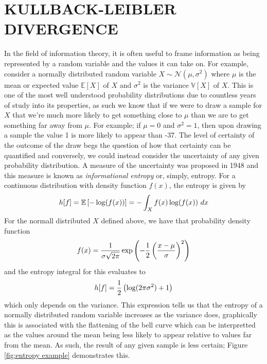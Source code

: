\chapter{KULLBACK-LEIBLER DIVERGENCE}
\label{chap:KLD}
In the field of information theory, it is often useful to frame information as being 
represented by a random variable and the values it can take on. For example, consider 
a normally distributed random variable $X \sim \mathcal{N}(\mu, \sigma^2)$ where $\mu$ is the 
mean or expected value $\mathbb{E}[X]$ of $X$ and $\sigma^2$ is the variance 
$\mathbb{V}[X]$ of $X$. This is one of the most well understood probability distributions
due to countless years of study into its properties, as such we know that if we were to 
draw a sample for $X$ that we're much more likely to get something close to $\mu$
than we are to get something far away from $\mu$. For example; if $\mu = 0$ and 
$\sigma^2 = 1$, then upon drawing a sample the value 1 is more likely to appear
than -37. The level of certainty of the outcome of the draw begs the question of 
how that certainty can be quantified and conversely, we could instead consider the 
uncertainty of any given probability distribution. A measure of the uncertainty was 
proposed in 1948 and this measure is known as \emph{informational entropy} \cite{shannon}
or, simply, entropy. For a
continuous distribution with density function $f(x)$, the entropy is given by 
\begin{equation}
    h[f] = \mathbb{E}\left[-\log(f(x))\right] = -\int_X f(x)\log(f(x))\ dx    
\end{equation}
For the normall distributed $X$ defined above, we have that probability density function
\begin{equation}
   f(x) = \frac{1}{\sigma\sqrt{2\pi}}\exp\left(-\frac{1}{2}\left(\frac{x-\mu}{\sigma}\right)^2\right) \label{eqn:normal} 
\end{equation}
and the entropy integral for this evaluates to
\begin{equation}
    h[f] = \frac{1}{2}\left(\log(2\pi\sigma^2) + 1\right)
\end{equation}
which only depends on the variance. This expression tells us that the entropy of a
normally distributed random variable increases as the variance does, graphically this is 
associated with the flattening of the bell curve which can be interpretted as the values 
around the mean being less likely to appear relative to values far from the mean. As such, 
the result of any given sample is less certain; Figure \ref{fig:entropy example} demonstrates 
this.


